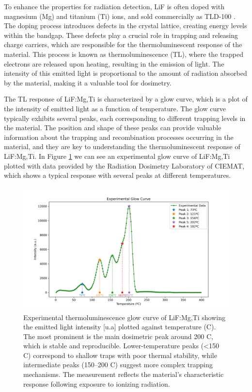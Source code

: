 To enhance the properties for radiation detection, LiF is often doped with magnesium (Mg) and titanium (Ti) ions, and sold commercially as TLD-100 \cite{lif}. The doping process introduces defects in the crystal lattice, creating energy levels within the bandgap. These defects play a crucial role in trapping and releasing charge carriers, which are responsible for the thermoluminescent response of the material. This process is known as thermoluminescence (TL), where the trapped electrons are released upon heating, resulting in the emission of light. The intensity of this emitted light is proportional to the amount of radiation absorbed by the material, making it a valuable tool for dosimetry.

\vspace{10pt}

The TL response of LiF:Mg,Ti is characterized by a glow curve, which is a plot of the intensity of emitted light as a function of temperature. The glow curve typically exhibits several peaks, each corresponding to different trapping levels in the material. The position and shape of these peaks can provide valuable information about the trapping and recombination processes occurring in the material, and they are key to understanding the thermoluminescent response of LiF:Mg,Ti. In Figure \ref{fig:ExperimentalGlowCurve} we can see an experimental glow curve of LiF:Mg,Ti plotted with data provided by the Radiation Dosimetry Laboratory of CIEMAT, which shows a typical response with several peaks at different temperatures. 

\begin{figure}[ht]
    \centering
    \includegraphics[width=\textwidth]{Images/Experimental_Glow_Curve.png}
    \caption{Experimental thermoluminescence glow curve of LiF:Mg,Ti showing the emitted light intensity [u.a] plotted against temperature (\textdegree C). The most prominent is the main dosimetric peak around 200 \textdegree C, which is stable and reproducible. Lower-temperature peaks (<150 \textdegree C) correspond to shallow traps with poor thermal stability, while intermediate peaks (150–200 \textdegree C) suggest more complex trapping mechanisms. The measurement reflects the material’s characteristic response following exposure to ionizing radiation.}
    \label{fig:ExperimentalGlowCurve}
\end{figure}
\vspace{10pt}

